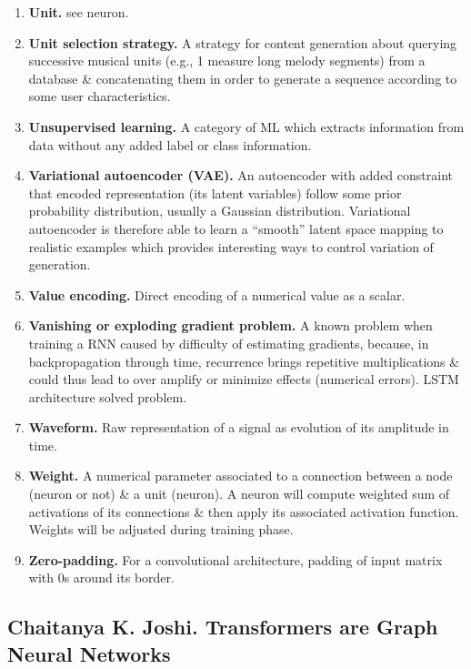 \documentclass{article}
\begin{document}
\begin{itemize}
\begin{enumerate}
		\item {\bf Unit.} see neuron.
		\item {\bf Unit selection strategy.} A strategy for content generation about querying successive musical units (e.g., 1 measure long melody segments) from a database \& concatenating them in order to generate a sequence according to some user characteristics.
		\item {\bf Unsupervised learning.} A category of ML which extracts information from data without any added label or class information.
		\item {\bf Variational autoencoder (VAE).} An autoencoder with added constraint that encoded representation (its latent variables) follow some prior probability distribution, usually a Gaussian distribution. Variational autoencoder is therefore able to learn a ``smooth'' latent space mapping to realistic examples which provides interesting ways to control variation of generation.
		\item {\bf Value encoding.} Direct encoding of a numerical value as a scalar.
		\item {\bf Vanishing or exploding gradient problem.} A known problem when training a RNN caused by difficulty of estimating gradients, because, in backpropagation through time, recurrence brings repetitive multiplications \& could thus lead to over amplify or minimize effects (numerical errors). LSTM architecture solved problem.
		\item {\bf Waveform.} Raw representation of a signal as evolution of its amplitude in time.
		\item {\bf Weight.} A numerical parameter associated to a connection between a node (neuron or not) \& a unit (neuron). A neuron will compute weighted sum of activations of its connections \& then apply its associated activation function. Weights will be adjusted during training phase.
		\item {\bf Zero-padding.} For a convolutional architecture, padding of input matrix with 0s around its border.
	\end{enumerate}
\end{itemize}


\subsection{{\sc Chaitanya K. Joshi}. Transformers are Graph Neural Networks}
\end{document}

